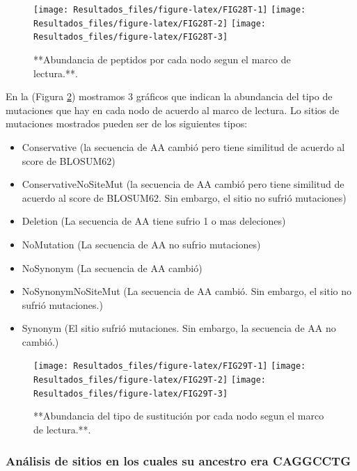 \documentclass[
]{book}
\providecommand{\tightlist}{%
  \setlength{\itemsep}{0pt}\setlength{\parskip}{0pt}}
\begin{document}
\begin{figure}

{\centering \texttt{[image: Resultados\_files/figure-latex/FIG28T-1]} \texttt{[image: Resultados\_files/figure-latex/FIG28T-2]} \texttt{[image: Resultados\_files/figure-latex/FIG28T-3]} 

}

\caption{**Abundancia de peptidos por cada nodo segun el marco de lectura.**.}\label{fig:FIG28T}
\end{figure}

En la (Figura \ref{fig:FIG29T}) mostramos 3 gráficos que indican la abundancia del tipo de mutaciones que hay en cada nodo de acuerdo al marco de lectura. Lo sitios de mutaciones mostrados pueden ser de los siguientes tipos:

\begin{itemize}
\tightlist
\item
  Conservative (la secuencia de AA cambió pero tiene similitud de acuerdo al score de BLOSUM62)
\item
  ConservativeNoSiteMut (la secuencia de AA cambió pero tiene similitud de acuerdo al score de BLOSUM62. Sin embargo, el sitio no sufrió mutaciones)
\item
  Deletion (La secuencia de AA tiene sufrio 1 o mas deleciones)
\item
  NoMutation (La secuencia de AA no sufrio mutaciones)
\item
  NoSynonym (La secuencia de AA cambió)
\item
  NoSynonymNoSiteMut (La secuencia de AA cambió. Sin embargo, el sitio no sufrió mutaciones.)
\item
  Synonym (El sitio sufrió mutaciones. Sin embargo, la secuencia de AA no cambió.)
\end{itemize}

\begin{figure}

{\centering \texttt{[image: Resultados\_files/figure-latex/FIG29T-1]} \texttt{[image: Resultados\_files/figure-latex/FIG29T-2]} \texttt{[image: Resultados\_files/figure-latex/FIG29T-3]} 

}

\caption{**Abundancia del tipo de sustitución por cada nodo segun el marco de lectura.**.}\label{fig:FIG29T}
\end{figure}

\hypertarget{anuxe1lisis-de-sitios-en-los-cuales-su-ancestro-era-caggcctg}{%
\subsubsection{Análisis de sitios en los cuales su ancestro era CAGGCCTG}\label{anuxe1lisis-de-sitios-en-los-cuales-su-ancestro-era-caggcctg}}
\end{document}
